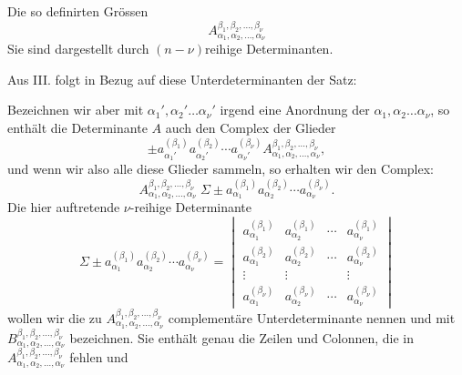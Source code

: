 
Die so definirten Grössen
\[
        A_{\alpha_1,\alpha_2,\ldots,\alpha_\nu}^{\beta_1,\beta_2,\ldots,\beta_\nu}
\]
 Sie sind dargestellt durch \((n-\nu)\)reihige Determinanten.

Aus III. folgt in Bezug auf diese Unterdeterminanten der Satz:


Bezeichnen wir aber mit \(\alpha_1',\alpha_2'\ldots\alpha_\nu'\) irgend eine Anordnung der \(\alpha_1,\alpha_2\ldots\alpha_\nu\), so enthält die Determinante \(A\) auch den Complex der Glieder
\[
        \pm a_{\alpha_1'}^{(\beta_1)}a_{\alpha_2'}^{(\beta_2)}\cdots
        a_{\alpha_\nu'}^{(\beta_\nu)}
        A_{\alpha_1,\alpha_2,\ldots,\alpha_\nu}^{\beta_1,\beta_2,\ldots,\beta_\nu},
\]
und wenn wir also alle diese Glieder sammeln, so erhalten wir den Complex:
\begin{equation}
        A_{\alpha_1,\alpha_2,\ldots,\alpha_\nu}^{\beta_1,\beta_2,\ldots,\beta_\nu}
        \;\Sigma\pm a_{\alpha_1}^{(\beta_1)}a_{\alpha_2}^{(\beta_2)}\cdots a_{\alpha_\nu}^{(\beta_\nu)}.
\tag{6}
\end{equation}
Die hier auftretende \(\nu\)-reihige Determinante
\[
        \Sigma\pm a_{\alpha_1}^{(\beta_1)}a_{\alpha_2}^{(\beta_2)}\cdots a_{\alpha_\nu}^{(\beta_\nu)}=
        \begin{vmatrix}
        a_{\alpha_1}^{(\beta_1)}&a_{\alpha_2}^{(\beta_1)}&\cdots&a_{\alpha_\nu}^{(\beta_1)}\\
        a_{\alpha_1}^{(\beta_2)}&a_{\alpha_2}^{(\beta_2)}&\cdots&a_{\alpha_\nu}^{(\beta_2)}\\
        \vdots&\vdots&&\vdots\\
        a_{\alpha_1}^{(\beta_\nu)}&a_{\alpha_2}^{(\beta_\nu)}&\cdots&a_{\alpha_\nu}^{(\beta_\nu)}
        \end{vmatrix}
\]
wollen wir die zu \(A_{\alpha_1,\alpha_2,\ldots,\alpha_\nu}^{\beta_1,\beta_2,\ldots,\beta_\nu}\) complementäre Unterdeterminante nennen und mit \(B_{\alpha_1,\alpha_2,\ldots,\alpha_\nu}^{\beta_1,\beta_2,\ldots,\beta_\nu}\) bezeichnen. Sie enthält genau die Zeilen und Colonnen, die in \(A_{\alpha_1,\alpha_2,\ldots,\alpha_\nu}^{\beta_1,\beta_2,\ldots,\beta_\nu}\) fehlen und
